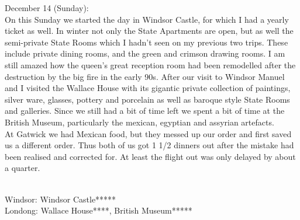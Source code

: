 December 14 (Sunday):\\
On this Sunday we started the day in Windsor Castle, for which I had a yearly ticket as well. In winter not only the State Apartments are open, but as well the semi-private State Rooms which I hadn't seen on my previous two trips. These include private dining rooms, and the green and crimson drawing rooms. I am still amazed how the queen's great reception room had been remodelled after the destruction by the big fire in the early 90s. After our visit to Windsor Manuel and I visited the Wallace House with its gigantic private collection of paintings, silver ware, glasses, pottery and porcelain as well as baroque style State Rooms and galleries. Since we still had a bit of time left we spent a bit of time at the British Museum, particularly the mexican, egyptian and assyrian artefacts.\\
At Gatwick we had Mexican food, but they messed up our order and first saved us a different order. Thus both of us got 1 1/2 dinners out after the mistake had been realised and corrected for. At least the flight out was only delayed by about a quarter.\\\

Windsor: Windsor Castle*****\\
Londong: Wallace House****, British Museum*****